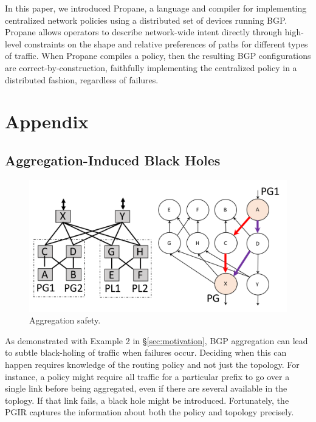\documentclass{sig-alternate-10pt}
\newcommand{\sysname}{{\small \sf Propane}\xspace}
\begin{document}
In this paper, we introduced \sysname, a language and compiler for implementing centralized network policies using a distributed set of devices running BGP. Propane allows operators to describe network-wide intent directly through high-level constraints on the shape and relative preferences of paths for different types of traffic. When \sysname compiles a policy, then the resulting BGP configurations are correct-by-construction, faithfully implementing the centralized policy in a distributed fashion, regardless of failures.



%
%
%
%

\section*{Appendix}
\label{sec:appendix}

\renewcommand\thesubsection{\Alph{subsection}}

\subsection{Aggregation-Induced Black Holes}
\label{sec:black-holes}

\begin{figure}[t!]
  \centering
  \includegraphics[width=\columnwidth]{figures/aggregation}
  \caption{Aggregation safety.}
  \label{fig:aggregation-safety}
  \vspace{-1em}
\end{figure}


As demonstrated with Example 2 in \S\ref{sec:motivation}, BGP aggregation can lead to subtle black-holing of traffic when failures occur. Deciding when this can happen requires knowledge of the routing policy and not just the topology. For instance, a policy might require all traffic for a particular prefix to go over a single link before being aggregated, even if there are several available in the toplogy. If that link fails, a black hole might be introduced. Fortunately, the PGIR captures the information about both the policy and topology precisely.
\end{document}
